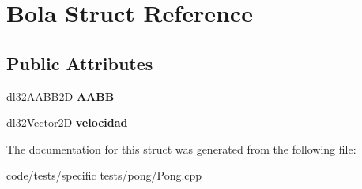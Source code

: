 \hypertarget{struct_bola}{\section{Bola Struct Reference}
\label{struct_bola}
}
\subsection*{Public Attributes}
\begin{DoxyCompactItemize}
\item 
\hypertarget{struct_bola_a55e1742dc128e150dbfe2294408101ec}{\hyperlink{classdl32_a_a_b_b2_d}{dl32\-A\-A\-B\-B2\-D} {\bfseries A\-A\-B\-B}}\label{struct_bola_a55e1742dc128e150dbfe2294408101ec}

\item 
\hypertarget{struct_bola_a9c56c352c7dbeab0413a2dd42ec12397}{\hyperlink{structdl32_vector2_d}{dl32\-Vector2\-D} {\bfseries velocidad}}\label{struct_bola_a9c56c352c7dbeab0413a2dd42ec12397}

\end{DoxyCompactItemize}


The documentation for this struct was generated from the following file\-:\begin{DoxyCompactItemize}
\item 
code/tests/specific tests/pong/Pong.\-cpp\end{DoxyCompactItemize}
